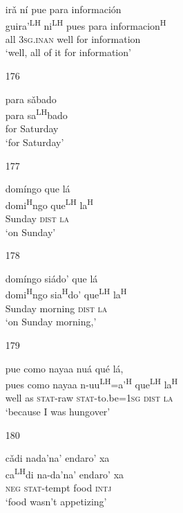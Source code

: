 \begin{itemize}
\glll   ir\v{a} n\'{i} pue para informaci\'{o}n \\
guira'\textsuperscript{LH} ni\textsuperscript{LH} pues para informacion\textsuperscript{H} \\
all \textsc{3sg.inan} well for information\\
\glt `well, all of it for information'
 


\item[176]
 
\glll   para s\v{a}bado \\
 para sa\textsuperscript{LH}bado\\
for Saturday\\
\glt `for Saturday'
 

\item[177]
 
\glll   dom\'{i}ngo que l\'{a}\\
 domi\textsuperscript{H}ngo que\textsuperscript{LH} la\textsuperscript{H}\\
Sunday \textsc{dist} \textsc{la}\\
\glt `on Sunday'
 

\item[178]
 
\glll   dom\'{i}ngo si\'{a}do' que l\'{a} \\
 domi\textsuperscript{H}ngo sia\textsuperscript{H}do' que\textsuperscript{LH} la\textsuperscript{H}\\
Sunday morning \textsc{dist} \textsc{la}\\
\glt `on Sunday morning,'
 


\item[179]
 
\glll   pue como nayaa nu\'{a} qu\'{e} l\'{a},\\
pues como nayaa n-uu\textsuperscript{LH}=a'\textsuperscript{H} que\textsuperscript{LH} la\textsuperscript{H}\\
well as \textsc{stat}-raw \textsc{stat}-to.be=\textsc{1sg} \textsc{dist} \textsc{la}\\
\glt `because I was hungover'
 


\item[180]
 
\glll   c\v{a}di nada'na' endaro' xa\\
ca\textsuperscript{LH}di na-da'na' endaro' xa \\
\textsc{neg} \textsc{stat}-tempt  food \textsc{intj}\\
\glt `food wasn't appetizing'
 


\end{itemize}
